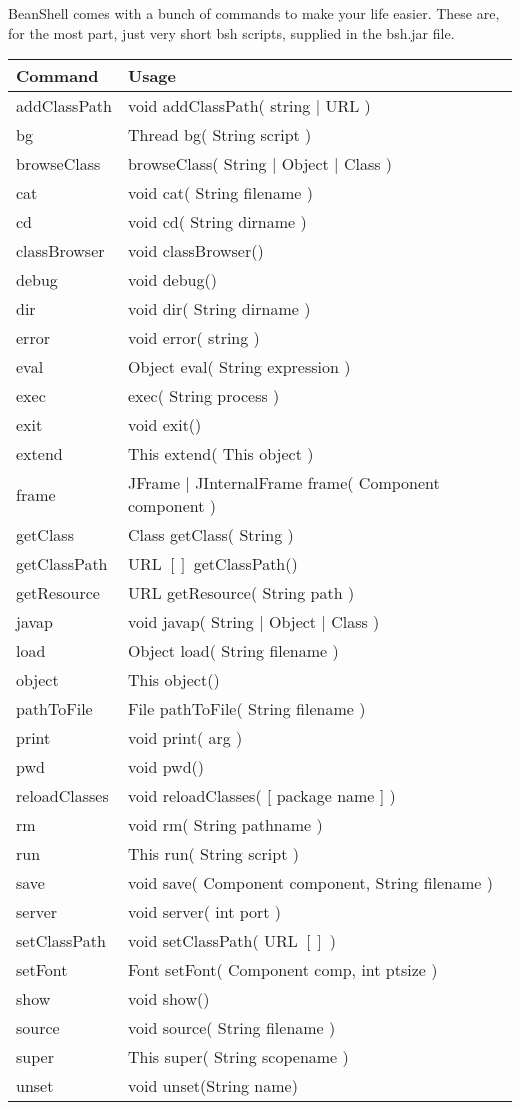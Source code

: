 \documentclass[twoside,11pt,nolof]{starlink}
\begin{document}
BeanShell comes with a bunch of commands to make your life easier.
These are, for the most part, just very short bsh scripts, supplied in the
bsh.jar file.

\begin{tabular}{|l|l|}
\hline
Command       & Usage \\
\hline
addClassPath  & void addClassPath( string $|$ URL )\\
bg            & Thread bg( String script )\\
browseClass   & browseClass( String $|$ Object $|$ Class )\\
cat           & void cat( String filename )\\
cd            & void cd( String dirname )\\
classBrowser  & void classBrowser()\\
debug         & void debug()\\
dir           & void dir( String dirname )\\
error         & void error( string )\\
eval          & Object eval( String expression )\\
exec          & exec( String process )\\
exit          & void exit()\\
extend        & This extend( This object )\\
frame         & JFrame $|$ JInternalFrame frame( Component component )\\
getClass      & Class getClass( String )\\
getClassPath  & URL $[]$ getClassPath()\\
getResource   & URL getResource( String path )\\
javap         & void javap( String $|$ Object $|$ Class )\\
load          & Object load( String filename )\\
object        & This object()\\
pathToFile    & File pathToFile( String filename )\\
print         & void print( arg )\\
pwd           & void pwd()\\
reloadClasses & void reloadClasses( [ package name ] )\\
rm            & void rm( String pathname )\\
run           & This run( String script )\\
save          & void save( Component component, String filename )\\
server        & void server( int port )\\
setClassPath  & void setClassPath( URL $[]$ )\\
setFont       & Font setFont( Component comp, int ptsize )\\
show          & void show()\\
source        & void source( String filename )\\
super         & This super( String scopename )\\
unset         & void unset(String name)\\
\hline
\end{tabular}
\end{document}
